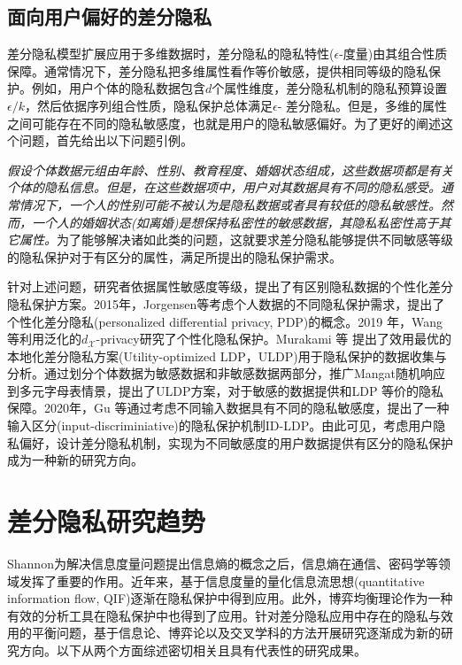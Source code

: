 \subsection{面向用户偏好的差分隐私}

差分隐私模型扩展应用于多维数据时，差分隐私的隐私特性($\epsilon$-度量)由其组合性质保障。通常情况下，差分隐私把多维属性看作等价敏感，提供相同等级的隐私保护。例如，用户个体的隐私数据包含$d$个属性维度，差分隐私机制的隐私预算设置$\epsilon/k$，然后依据序列组合性质，隐私保护总体满足$\epsilon$- 差分隐私。但是，多维的属性之间可能存在不同的隐私敏感度，也就是用户的隐私敏感偏好。为了更好的阐述这个问题，首先给出以下问题引例。

{\em 假设个体数据元组由年龄、性别、教育程度、婚姻状态组成，这些数据项都是有关个体的隐私信息。但是，在这些数据项中，用户对其数据具有不同的隐私感受。通常情况下，一个人的性别可能不被认为是隐私数据或者具有较低的隐私敏感性。然而，一个人的婚姻状态(如离婚)是想保持私密性的敏感数据，其隐私私密性高于其它属性。}为了能够解决诸如此类的问题，这就要求差分隐私能够提供不同敏感等级的隐私保护对于有区分的属性，满足所提出的隐私保护需求。

针对上述问题，研究者依据属性敏感度等级，提出了有区别隐私数据的个性化差分隐私保护方案\cite{chen2016private}。2015年，Jorgensen等\cite{jorgensen2015conservative}考虑个人数据的不同隐私保护需求，提出了个性化差分隐私(personalized differential privacy, PDP)的概念。2019 年，Wang等\cite{wang2019personalized}利用泛化的$d_{\mathcal{X}}$-privacy\cite{chatzikokolakis2013broadening}研究了个性化隐私保护。Murakami 等\cite{murakami2019utility} 提出了效用最优的本地化差分隐私方案(Utility-optimized LDP，ULDP)用于隐私保护的数据收集与分析。通过划分个体数据为敏感数据和非敏感数据两部分，推广Mangat\cite{mangat1994an}随机响应到多元字母表情景，提出了ULDP方案，对于敏感的数据提供和LDP 等价的隐私保障。2020年，Gu 等\cite{gu2020providing}通过考虑不同输入数据具有不同的隐私敏感度，提出了一种输入区分(input-discriminiative)的隐私保护机制ID-LDP。由此可见，考虑用户隐私偏好，设计差分隐私机制，实现为不同敏感度的用户数据提供有区分的隐私保护成为一种新的研究方向。

\section{差分隐私研究趋势}
Shannon\cite{shannon1948a}为解决信息度量问题提出信息熵的概念之后，信息熵在通信、密码学等领域发挥了重要的作用。近年来，基于信息度量的量化信息流思想(quantitative information flow, QIF)逐渐在隐私保护中得到应用。此外，博弈均衡理论作为一种有效的分析工具在隐私保护中也得到了应用。针对差分隐私应用中存在的隐私与效用的平衡问题，基于信息论、博弈论以及交叉学科的方法开展研究逐渐成为新的研究方向。以下从两个方面综述密切相关且具有代表性的研究成果。

